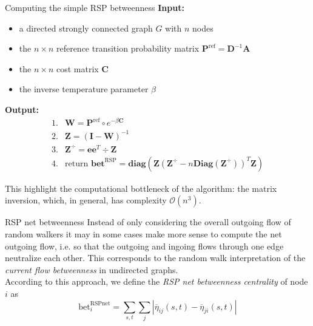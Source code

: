 \documentclass[13pt]{beamer}
\begin{document}
    \begin{frame}[t,allowframebreaks]{Computing the simple RSP betweenness}
    \textbf{Input:}
    \begin{itemize}
        \item a directed strongly connected graph $G$ with $n$ nodes
        \item the $n\times n$ reference transition probability matrix $\mathbf{P}^\text{ref}=\mathbf{D}^{-1}\mathbf{A}$
        \item the $n\times n$ cost matrix $\mathbf{C}$
        \item the inverse temperature parameter $\beta$
    \end{itemize}

    \textbf{Output:}
    \begin{equation*}
    \begin{array}{cl}
    1. & \mathbf{W}=\mathbf{P}^\text{ref}\circ e^{-\beta\mathbf{C}} \\
    2. & \mathbf{Z}=(\mathbf{I}-\mathbf{W})^{-1} \\
    3. & \mathbf{Z}^\div=\mathbf{e}\mathbf{e}^T\div\mathbf{Z} \\
    4. & \text{return }\textbf{bet}^\text{RSP}=\textbf{diag}\left( \mathbf{Z} \left(\mathbf{Z}^\div-n \textbf{Diag}\left( \mathbf{Z}^\div \right) \right)^T\mathbf{Z} \right)
    \end{array}
    \end{equation*}

    This highlight the computational bottleneck of the algorithm: the matrix inversion, which, in general, has complexity $\mathcal{O}\left( n^3 \right)$. %
    \end{frame}

    \begin{frame}[t,allowframebreaks]{RSP net betweenness}
    Instead of only considering the overall outgoing flow of random walkers it may in some cases make more sense to compute the net outgoing flow, i.e. so that the outgoing and ingoing flows through one edge neutralize each other. This corresponds to the random walk interpretation of the \emph{current flow betweenness} in undirected graphs.\\%
    \vspace{0.8em} 
    According to this approach, we define the \emph{RSP net betweenness centrality} of node $i$ as
    \begin{equation*}
    \text{bet}_i^{\text{RSPnet}}=\sum_{s,t}
    \sum_{j}\left|\overline{\eta}_{ij}(s,t)-\overline{\eta}_{ji}(s,t)\right|
    \end{equation*}

    \end{frame}
\end{document}
